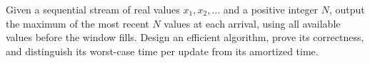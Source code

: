 Given a sequential stream of real values $x_1,x_2,\ldots$ and a positive integer $N$, output the maximum of the most recent $N$ values at each arrival, using all available values before the window fills. Design an efficient algorithm, prove its correctness, and distinguish its worst-case time per update from its amortized time.
